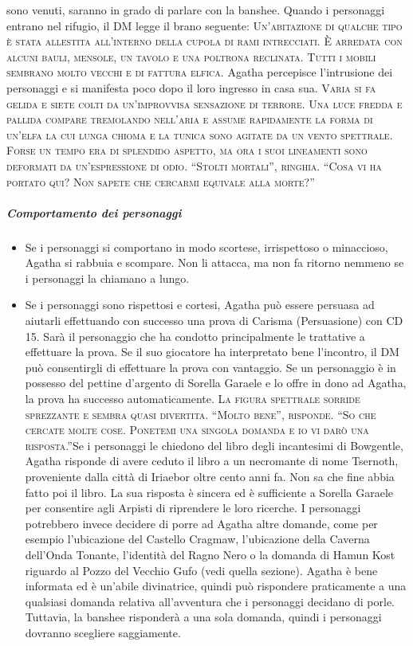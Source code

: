 \documentclass{article}
\begin{document}
sono venuti, saranno in grado di parlare con la banshee.
Quando i personaggi entrano nel rifugio, il DM legge il
brano seguente: \textsc{Un’abitazione di qualche tipo è stata allestita all’interno
della cupola di rami intrecciati. È arredata con alcuni bauli,
mensole, un tavolo e una poltrona reclinata. Tutti i mobili
sembrano molto vecchi e di fattura elfica.}
Agatha percepisce l’intrusione dei personaggi e si manifesta
poco dopo il loro ingresso in casa sua. \textsc{Varia si fa gelida e siete colti da un'improvvisa sensazione di
terrore. Una luce fredda e pallida compare tremolando nell'aria
e assume rapidamente la forma di un'elfa la cui lunga chioma e
la tunica sono agitate da un vento spettrale. Forse un tempo era
di splendido aspetto, ma ora i suoi lineamenti sono deformati
da un'espressione di odio. “Stolti mortali”, ringhia. “Cosa vi ha
portato qui? Non sapete che cercarmi equivale alla morte?”}

    \subparagraph{Comportamento dei personaggi}
    \begin{itemize}
        \item Se i personaggi si comportano in modo scortese, irrispettoso
o minaccioso, Agatha si rabbuia e scompare. Non li
attacca, ma non fa ritorno nemmeno se i personaggi la
chiamano a lungo.
        \item Se i personaggi sono rispettosi e cortesi, Agatha può essere
persuasa ad aiutarli effettuando con successo una prova di
Carisma (Persuasione) con CD 15. Sarà il personaggio che
ha condotto principalmente le trattative a effettuare la prova.
Se il suo giocatore ha interpretato bene l’incontro, il DM
può consentirgli di effettuare la prova con vantaggio. Se un
personaggio è in possesso del pettine d’argento di Sorella Garaele e lo offre in dono ad Agatha, la prova ha successo
automaticamente. \textsc{La figura spettrale sorride sprezzante e sembra quasi divertita.
“Molto bene”, risponde. “So che cercate molte cose. Ponetemi
una singola domanda e io vi darò una risposta.”}Se i personaggi le chiedono del libro degli incantesimi di
Bowgentle, Agatha risponde di avere ceduto il libro a un
necromante di nome Tsernoth, proveniente dalla città di
Iriaebor oltre cento anni fa. Non sa che fine abbia fatto
poi il libro. La sua risposta è sincera ed è sufficiente a
Sorella Garaele per consentire agli Arpisti di riprendere le
loro ricerche.
I personaggi potrebbero invece decidere di porre ad Agatha
altre domande, come per esempio l'ubicazione del Castello
Cragmaw, l'ubicazione della Caverna dell’Onda Tonante,
l'identità del Ragno Nero o la domanda di Hamun Kost
riguardo al Pozzo del Vecchio Gufo (vedi quella sezione).
Agatha è bene informata ed è un’abile divinatrice, quindi può
rispondere praticamente a una qualsiasi domanda relativa
all'avventura che i personaggi decidano di porle. Tuttavia, la
banshee risponderà a una sola domanda, quindi i personaggi
dovranno scegliere saggiamente.
    \end{itemize}
\end{document}
